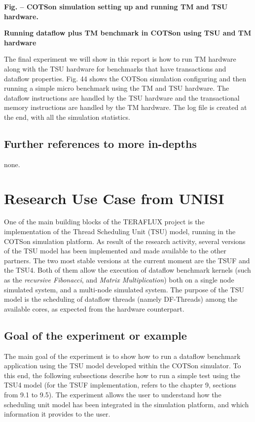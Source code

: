 \documentclass[a4paper]{article}
\newcounter{Figure}
\renewcommand\theFigure{\arabic{Figure}}
\begin{document}
{\centering{}\sffamily\bfseries
\label{bkm:Ref388171011}Fig.
\stepcounter{Figure}{\theFigure} -- COTSon simulation setting up and
running TM and TSU hardware.
\par}

{
\textbf{Running dataflow plus TM benchmark in COTSon using TSU and TM
hardware}}

{
The final experiment we will show in this report is how to run TM
hardware along with the TSU hardware for benchmarks that have
transactions and dataflow properties. Fig. 44 shows the COTSon
simulation configuring and then running a simple micro benchmark using
the TM and TSU hardware. The dataflow instructions are handled by the
TSU hardware and the transactional memory instructions are handled by
the TM hardware. The log file is created at the end, with all the
simulation statistics.}

\subsection[Further references to more in{}-depths]{Further references
to more in-depths}
{
none.}

\section[Research Use Case from UNISI]{Research Use Case from UNISI}
\label{bkm:Ref388221943}{
One of the main building blocks of the TERAFLUX project is the
implementation of the Thread Scheduling Unit (TSU) model, running in
the COTSon simulation platform. As result of the research activity,
several versions of the TSU model has been implemented and made
available to the other partners. The two most stable versions at the
current moment are the TSUF and the TSU4. Both of them allow the
execution of dataflow benchmark kernels (such as the \textit{recursive
Fibonacci}, and \textit{Matrix Multiplication}) both on a single node
simulated system, and a multi-node simulated system. The purpose of the
TSU model is the scheduling of dataflow threads (namely DF-Threads)
among the available cores, as expected from the hardware counterpart.}

\subsection[Goal of the experiment or example]{Goal of the experiment or
example}
{
The main goal of the experiment is to show how to run a dataflow
benchmark application using the TSU model developed within the COTSon
simulator. To this end, the following subsections describe how to run a
simple test using the TSU4 model (for the TSUF implementation, refers
to the chapter 9, sections from 9.1 to 9.5). The experiment allows the
user to understand how the scheduling unit model has been integrated in
the simulation platform, and which information it provides to the
user.}
\end{document}
